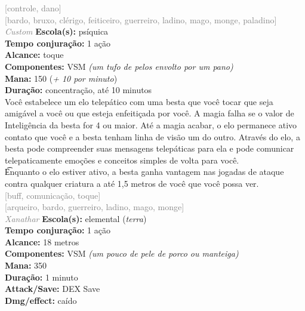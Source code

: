\documentclass{RPG_Adventure}[2021/10/20]
\begin{document}
{\scriptsize \textcolor{gray}{[controle, dano]\\}}
{\scriptsize \textcolor{gray}{[bardo, bruxo, clérigo, feiticeiro, guerreiro, ladino, mago, monge, paladino]\\}}
{\tiny \textcolor{gray}{\textit{Custom}}}
{\small \t \textbf{Escola(s):} psíquica\\\t \textbf{Tempo conjuração:} 1 ação\\\t \textbf{Alcance:} toque\\\t \textbf{Componentes:} VSM \textit{(um tufo de pelos envolto por um pano)}\\\t \textbf{Mana:} 150 (\textit{+ 10 por minuto})\\\t \textbf{Duração:} concentração, até 10 minutos\\}
{\normalsize Você estabelece um elo telepático com uma besta que você tocar que seja amigável a você ou que esteja enfeitiçada por você. A magia falha se o valor de Inteligência da besta for 4 ou maior. Até a magia acabar, o elo permanece ativo contato que você e a besta tenham linha de visão um do outro. Através do elo, a besta pode compreender suas mensagens telepáticas para ela e pode comunicar telepaticamente emoções e conceitos simples de volta para você.\\\t Enquanto o elo estiver ativo, a besta ganha vantagem nas jogadas de ataque contra qualquer criatura a até 1,5 metros de você que você possa ver.\\}
{\scriptsize \textcolor{gray}{[buff, comunicação, toque]\\}}
{\scriptsize \textcolor{gray}{[arqueiro, bardo, guerreiro, ladino, mago, monge]\\}}
{\tiny \textcolor{gray}{\textit{Xanathar}}}
{\small \t \textbf{Escola(s):} elemental (\textit{terra})\\\t \textbf{Tempo conjuração:} 1 ação\\\t \textbf{Alcance:} 18 metros\\\t \textbf{Componentes:} VSM \textit{(um pouco de pele de porco ou manteiga)}\\\t \textbf{Mana:} 350\\\t \textbf{Duração:} 1 minuto\\\t \textbf{Attack/Save:} DEX Save\\\t \textbf{Dmg/effect:} caído\\}
\end{document}
